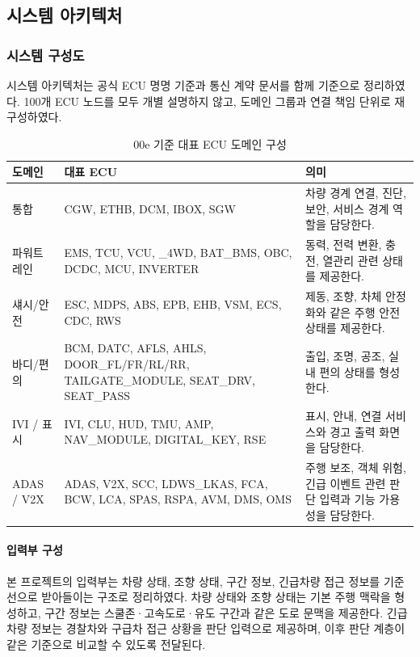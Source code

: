 \documentclass[11pt,a4paper]{article}
\begin{document}
\subsection{시스템 아키텍처}
\subsubsection{시스템 구성도}
시스템 아키텍처는 공식 ECU 명명 기준과 통신 계약 문서를 함께 기준으로 정리하였다. 100개 ECU 노드를 모두 개별 설명하지 않고, 도메인 그룹과 연결 책임 단위로 재구성하였다.

\begin{table}[H]
\centering
\begin{tabularx}{\textwidth}{|p{28mm}|p{48mm}|X|}
\hline
\textbf{도메인} & \textbf{대표 ECU} & \textbf{의미} \\ \hline
통합 & CGW, ETHB, DCM, IBOX, SGW & 차량 경계 연결, 진단, 보안, 서비스 경계 역할을 담당한다. \\ \hline
파워트레인 & EMS, TCU, VCU, \_4WD, BAT\_BMS, OBC, DCDC, MCU, INVERTER & 동력, 전력 변환, 충전, 열관리 관련 상태를 제공한다. \\ \hline
섀시/안전 & ESC, MDPS, ABS, EPB, EHB, VSM, ECS, CDC, RWS & 제동, 조향, 차체 안정화와 같은 주행 안전 상태를 제공한다. \\ \hline
바디/편의 & BCM, DATC, AFLS, AHLS, DOOR\_FL/FR/RL/RR, TAILGATE\_MODULE, SEAT\_DRV, SEAT\_PASS & 출입, 조명, 공조, 실내 편의 상태를 형성한다. \\ \hline
IVI / 표시 & IVI, CLU, HUD, TMU, AMP, NAV\_MODULE, DIGITAL\_KEY, RSE & 표시, 안내, 연결 서비스와 경고 출력 화면을 담당한다. \\ \hline
ADAS / V2X & ADAS, V2X, SCC, LDWS\_LKAS, FCA, BCW, LCA, SPAS, RSPA, AVM, DMS, OMS & 주행 보조, 객체 위험, 긴급 이벤트 관련 판단 입력과 기능 가용성을 담당한다. \\ \hline
\end{tabularx}
\caption{00e 기준 대표 ECU 도메인 구성}
\end{table}

\paragraph{입력부 구성}
본 프로젝트의 입력부는 차량 상태, 조향 상태, 구간 정보, 긴급차량 접근 정보를 기준선으로 받아들이는 구조로 정리하였다. 차량 상태와 조향 상태는 기본 주행 맥락을 형성하고, 구간 정보는 스쿨존·고속도로·유도 구간과 같은 도로 문맥을 제공한다. 긴급차량 정보는 경찰차와 구급차 접근 상황을 판단 입력으로 제공하며, 이후 판단 계층이 같은 기준으로 비교할 수 있도록 전달된다.
\end{document}
